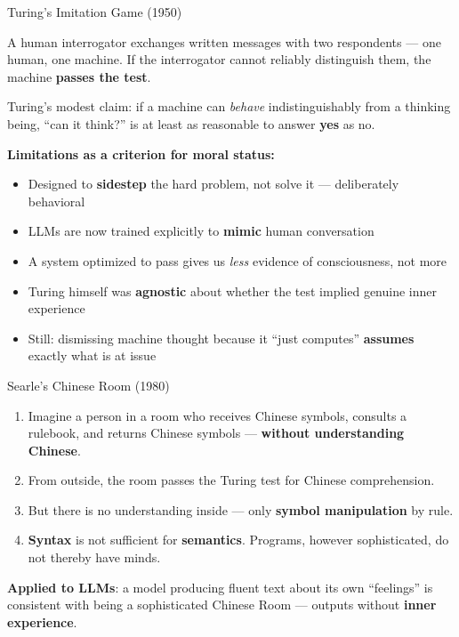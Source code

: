 \documentclass[aspectratio=169,11pt]{beamer}
\begin{document}
\begin{frame}[shrink=5]{Turing's Imitation Game (1950)}
\begin{conceptbox}
\small
A human interrogator exchanges written messages with two respondents --- one human, one machine. If the interrogator cannot reliably distinguish them, the machine \textbf{passes the test}.

\vspace{0.1cm}
Turing's modest claim: if a machine can \emph{behave} indistinguishably from a thinking being, ``can it think?'' is at least as reasonable to answer \textbf{yes} as no.
\end{conceptbox}

\vspace{0.15cm}
\textbf{Limitations as a criterion for moral status:}
\begin{itemize}
    \item Designed to \textbf{sidestep} the hard problem, not solve it --- deliberately behavioral
    \item LLMs are now trained explicitly to \textbf{mimic} human conversation
    \item A system optimized to pass gives us \emph{less} evidence of consciousness, not more
    \item Turing himself was \textbf{agnostic} about whether the test implied genuine inner experience
    \item Still: dismissing machine thought because it ``just computes'' \textbf{assumes} exactly what is at issue
\end{itemize}
\end{frame}

\begin{frame}[shrink=5]{Searle's Chinese Room (1980)}
\begin{argumentbox}
\small
\begin{enumerate}
    \item[\textbf{P1}] Imagine a person in a room who receives Chinese symbols, consults a rulebook, and returns Chinese symbols --- \textbf{without understanding Chinese}.
    \item[\textbf{P2}] From outside, the room passes the Turing test for Chinese comprehension.
    \item[\textbf{P3}] But there is no understanding inside --- only \textbf{symbol manipulation} by rule.
    \item[\textbf{C}] \textbf{Syntax} is not sufficient for \textbf{semantics}. Programs, however sophisticated, do not thereby have minds.
\end{enumerate}
\end{argumentbox}

\vspace{0.1cm}
\textbf{Applied to LLMs}: a model producing fluent text about its own ``feelings'' is consistent with being a sophisticated Chinese Room --- outputs without \textbf{inner experience}.
\end{frame}
\end{document}
